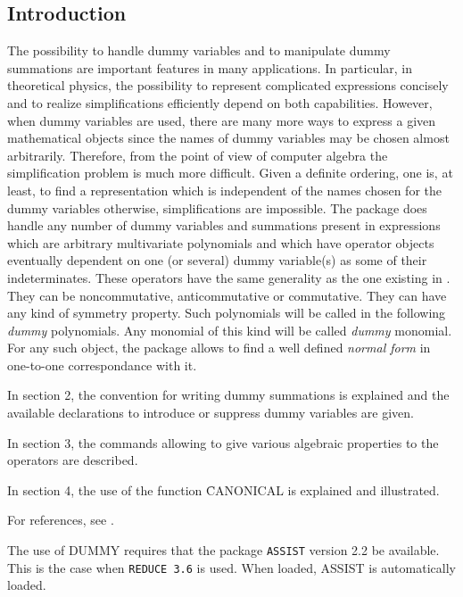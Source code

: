 

\subsection{Introduction}
The possibility to handle dummy variables and to manipulate  
dummy summations are important features in many applications. In particular, 
in theoretical physics, the possibility to represent complicated expressions
concisely and to realize simplifications efficiently depend 
on both capabilities.
However, when dummy variables are used, there are many more  ways 
to express a given mathematical objects since 
the names of dummy variables may be chosen  almost arbitrarily.
Therefore, from the point of view of computer algebra
the simplification problem is much more difficult. 
Given a definite ordering, one is, at least, to find a representation which 
is independent of the names chosen for the dummy variables otherwise, 
simplifications are impossible.  
The package does handle any number of dummy variables and summations 
present in expressions which are arbitrary multivariate polynomials  
and which  have operator objects eventually dependent on one (or several) 
dummy variable(s) as some of their indeterminates.
These operators have the same generality as the one existing in {\REDUCE}.  
They can be noncommutative, anticommutative or commutative. They can have 
any kind of symmetry property.
Such polynomials will be called in the following {\em dummy} polynomials.
Any monomial of this kind will be called  {\em dummy} monomial.
For any such object, the package allows to find a well defined 
{\em normal form} in one-to-one correspondance with it.

In section 2, the convention for writing dummy summations is explained 
and the available declarations to introduce or suppress dummy variables
are given.

In section 3, the commands allowing to give 
various algebraic properties to the operators are described.

In section 4, the use of the function \f{CANONICAL} is 
explained and illustrated.

For references, see \cite{BUTLER1985363,ButlerCannon1982a,Butler1982a,Leon1980a,Leon1984a,Leon1991PermutationGA,Linton1991415,McKay1977a,RodinonovElAl1989a,Sims1971a,Sims1971b,Burnel1994a,Caprasse1997a}.

The use of DUMMY requires that the package {\tt ASSIST} 
 version 2.2 be available.
This is the case when {\tt REDUCE 3.6} is used. When loaded, ASSIST is 
automatically loaded.
